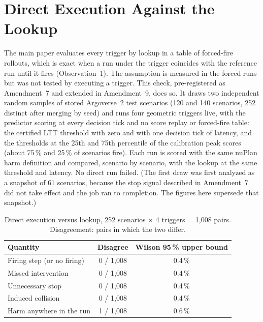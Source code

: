 \documentclass[lettersize,journal]{IEEEtran}
\begin{document}
\section{Direct Execution Against the Lookup}
\label{sec:s-direct}
The main paper evaluates every trigger by lookup in a table of forced-fire
rollouts, which is exact when a run under the trigger coincides with the
reference run until it fires (Observation~1). The assumption is
measured in the forced runs but was not tested by executing a trigger.
This check, pre-registered as Amendment~7 and extended in Amendment~9,
does so. It draws two independent random samples of stored Argoverse~2
test scenarios (120 and 140 scenarios, 252 distinct after merging by
seed) and runs four geometric triggers live, with the predictor scoring at
every decision tick and no score replay or forced-fire table: the
certified LTT threshold with zero and with one decision tick of latency,
and the thresholds at the 25th and 75th percentile of the calibration peak
scores (about 75\,\% and 25\,\% of scenarios fire). Each run is scored with
the same nuPlan harm definition and compared, scenario by scenario, with
the lookup at the same threshold and latency. No direct run failed.
(The first draw was first analyzed as a snapshot of 61 scenarios, because
the stop signal described in Amendment~7 did not take effect and the job
ran to completion. The figures here supersede that snapshot.)

\begin{table}[h]
\caption{Direct execution versus lookup, 252 scenarios $\times$ 4
triggers = 1{,}008 pairs. Disagreement: pairs in which the two differ.}
\label{tab:direct}
\centering
\scriptsize\setlength{\tabcolsep}{3pt}
\begin{tabular}{lcc}
\toprule
Quantity & Disagree & Wilson 95\,\% upper bound \\
\midrule
Firing step (or no firing) & 0 / 1{,}008 & 0.4\,\% \\
Missed intervention & 0 / 1{,}008 & 0.4\,\% \\
Unnecessary stop & 0 / 1{,}008 & 0.4\,\% \\
Induced collision & 0 / 1{,}008 & 0.4\,\% \\
Harm anywhere in the run & 1 / 1{,}008 & 0.6\,\% \\
\bottomrule
\end{tabular}
\end{table}
\end{document}
